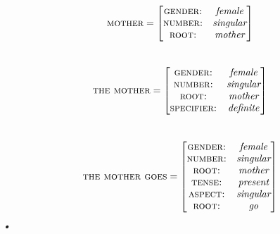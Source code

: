 \documentclass[12pt,a4paper]{article}
\begin{document}
			\[
\textsc{mother}=
\begin{bmatrix}
  \textsc{gender:} & \textit{female}\\
  \textsc{number:} & \textit{singular}\\
  \textsc{root:} & \textit{mother}\\
\end{bmatrix}
\]\\
\[
\textsc{the mother}=
\begin{bmatrix}
  \textsc{gender:} & \textit{female}\\
  \textsc{number:} & \textit{singular}\\
  \textsc{root:} & \textit{mother}\\
  \textsc{specifier:} & \textit{definite}\\
\end{bmatrix}
\]\\
\[
\textsc{the mother goes}=
\begin{bmatrix}
  \textsc{gender:} & \textit{female}\\
  \textsc{number:} & \textit{singular}\\
  \textsc{root:} & \textit{mother}\\
  \textsc{tense:} & \textit{present}\\
  \textsc{aspect:} & \textit{singular}\\
  \textsc{root:} & \textit{go}\\
\end{bmatrix}
\]
\textsl{•}
	
\end{document}
